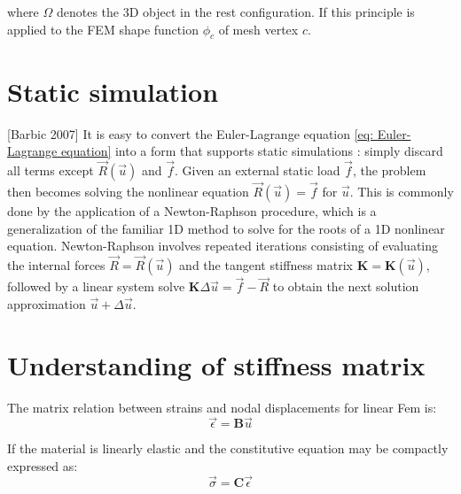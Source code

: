 \documentclass[10pt,a4paper]{article}
\begin{document}
where $ \Omega $ denotes the 3D object in the rest configuration. If this principle is applied to the FEM shape function $ \phi_c $ of mesh vertex $ c $.

\section{Static simulation}
[Barbic 2007] It is easy to convert the Euler-Lagrange equation \ref{eq: Euler-Lagrange equation} into a form that supports static simulations : simply discard all terms except $ \vec{R}(\vec{u}) $ and $ \vec{f} $. Given an external static load $ \vec{f} $, the problem then becomes solving the nonlinear equation $ \vec{R}(\vec{u}) = \vec{f} $ for $ \vec{u} $. This is commonly done by the application of a Newton-Raphson procedure, which is a generalization of the familiar 1D method to solve for the roots of a 1D nonlinear equation. Newton-Raphson involves repeated iterations consisting of evaluating the internal forces $ \vec{R}=\vec{R}(\vec{u}) $ and the tangent stiffness matrix $ \mathbf{K} = \mathbf{K}(\vec{u}) $, followed by a linear system solve $ \mathbf{K} \Delta \vec{u} = \vec{f} -\vec{R} $ to obtain the next solution approximation $ \vec{u}+ \Delta \vec{u} $.

\section{Understanding of stiffness matrix}
The matrix relation between strains and nodal displacements for linear Fem is:
\begin{equation}
\vec \epsilon = \mathbf{B} \vec{u}
\end{equation}

If the material is linearly elastic and the constitutive equation may be compactly expressed as:
\begin{equation}
\vec{\sigma} = \mathbf{C} \vec{\epsilon}
\end{equation}
\end{document}
